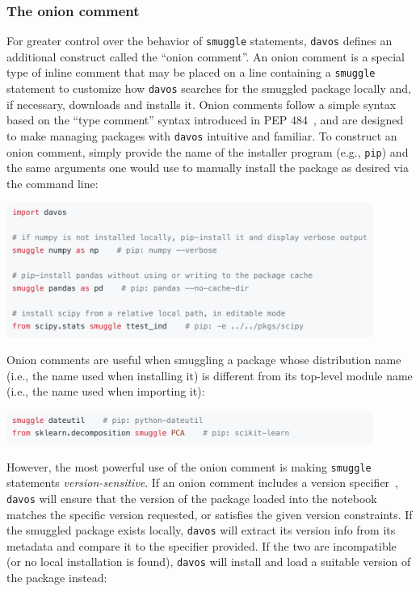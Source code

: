 \documentclass[preprint,12pt,a4paper]{elsarticle}
\begin{document}
\subsubsection{The onion comment}\label{subsec:onion}
For greater control over the behavior of \texttt{smuggle} statements, \texttt{davos} defines an additional construct called the ``onion comment''. An onion comment is a special type of inline comment that may be placed on a line containing a \texttt{smuggle} statement to customize how \texttt{davos} searches for the smuggled package locally and, if necessary, downloads and installs it. Onion comments follow a simple syntax based on the ``type comment'' syntax introduced in PEP 484~\cite{vanREtal14}, and are designed to make managing packages with \texttt{davos} intuitive and familiar. To construct an onion comment, simply provide the name of the installer program (e.g., \texttt{pip}) and the same arguments one would use to manually install the package as desired via the command line:
\begin{center}
\includegraphics[width=0.9\textwidth]{figs/snippet1}
\end{center}
Onion comments are useful when smuggling a package whose distribution name (i.e., the name used when installing it) is different from its top-level module name (i.e., the name used when importing it):
\begin{center}
\includegraphics[width=0.9\textwidth]{figs/snippet2}
\end{center}
However, the most powerful use of the onion comment is making \texttt{smuggle} statements \textit{version-sensitive}. If an onion comment includes a version specifier~\cite{CoghStuf13}, \texttt{davos} will ensure that the version of the package loaded into the notebook matches the specific version requested, or satisfies the given version constraints. If the smuggled package exists locally, \texttt{davos} will extract its version info from its metadata and compare it to the specifier provided. If the two are incompatible (or no local installation is found), \texttt{davos} will install and load a suitable version of the package instead:
\end{document}
